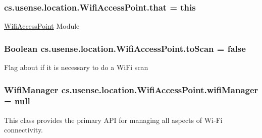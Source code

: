 \subsubsection[{that}]{ cs.\+usense.\+location.\+Wifi\+Access\+Point.\+that = this\hspace{0.3cm}{\ttfamily [private]}}\label{classcs_1_1usense_1_1location_1_1_wifi_access_point_afe22ca0f9a637b92889a09bc152ad2b5}
\hyperlink{classcs_1_1usense_1_1location_1_1_wifi_access_point}{Wifi\+Access\+Point} Module \hypertarget{classcs_1_1usense_1_1location_1_1_wifi_access_point_adc62ce55e5cb4824ae41777bc60a5ef5}{}
\subsubsection[{to\+Scan}]{\setlength{\rightskip}{0pt plus 5cm}Boolean cs.\+usense.\+location.\+Wifi\+Access\+Point.\+to\+Scan = false\hspace{0.3cm}{\ttfamily [private]}}\label{classcs_1_1usense_1_1location_1_1_wifi_access_point_adc62ce55e5cb4824ae41777bc60a5ef5}
Flag about if it is necessary to do a Wi\+Fi scan \hypertarget{classcs_1_1usense_1_1location_1_1_wifi_access_point_a45e15d0b01c86dea95b0fdc0aab838e3}{}
\subsubsection[{wifi\+Manager}]{\setlength{\rightskip}{0pt plus 5cm}Wifi\+Manager cs.\+usense.\+location.\+Wifi\+Access\+Point.\+wifi\+Manager = null\hspace{0.3cm}{\ttfamily [private]}}\label{classcs_1_1usense_1_1location_1_1_wifi_access_point_a45e15d0b01c86dea95b0fdc0aab838e3}
This class provides the primary A\+P\+I for managing all aspects of Wi-\/\+Fi connectivity. \hypertarget{classcs_1_1usense_1_1location_1_1_wifi_access_point_a0bbe319038518690675af07a94c5d419}{}
